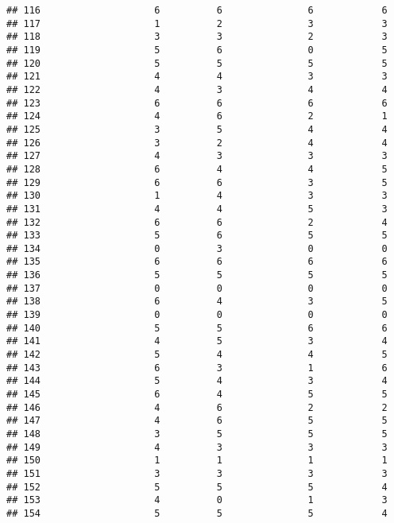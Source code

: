 \documentclass[
]{article}
\begin{document}
\begin{verbatim}
## 116                    6          6               6            6
## 117                    1          2               3            3
## 118                    3          3               2            3
## 119                    5          6               0            5
## 120                    5          5               5            5
## 121                    4          4               3            3
## 122                    4          3               4            4
## 123                    6          6               6            6
## 124                    4          6               2            1
## 125                    3          5               4            4
## 126                    3          2               4            4
## 127                    4          3               3            3
## 128                    6          4               4            5
## 129                    6          6               3            5
## 130                    1          4               3            3
## 131                    4          4               5            3
## 132                    6          6               2            4
## 133                    5          6               5            5
## 134                    0          3               0            0
## 135                    6          6               6            6
## 136                    5          5               5            5
## 137                    0          0               0            0
## 138                    6          4               3            5
## 139                    0          0               0            0
## 140                    5          5               6            6
## 141                    4          5               3            4
## 142                    5          4               4            5
## 143                    6          3               1            6
## 144                    5          4               3            4
## 145                    6          4               5            5
## 146                    4          6               2            2
## 147                    4          6               5            5
## 148                    3          5               5            5
## 149                    4          3               3            3
## 150                    1          1               1            1
## 151                    3          3               3            3
## 152                    5          5               5            4
## 153                    4          0               1            3
## 154                    5          5               5            4

\end{verbatim}
\end{document}
